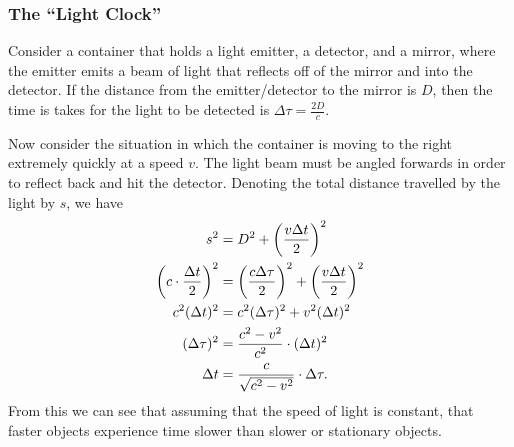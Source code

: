 \documentclass[class=article, crop=false]{standalone}
\begin{document}
  \subsubsection{The ``Light Clock''}
  Consider a container that holds a light emitter, a detector, and a mirror, where the emitter emits a beam of light that reflects off of the mirror and into the detector. If the distance from the emitter/detector to the mirror is $D$, then the time is takes for the light to be detected is $\Delta \tau = \frac{2D}{c}$. \par
  Now consider the situation in which the container is moving to the right extremely quickly at a speed $v$. The light beam must be angled forwards in order to reflect back and hit the detector. Denoting the total distance travelled by the light by $s$, we have
  \begin{align*}
    s^2 &= D^2 + \left( \frac{v\Delta t}{2} \right)^2 \\
    \left( c\cdot \frac{\Delta t}{2} \right)^2 &= \left( \frac{c\Delta\tau}{2} \right)^2 + \left( \frac{v\Delta t}{2} \right)^2 \\
    c^2(\Delta t)^2 &= c^2(\Delta\tau)^2 + v^2(\Delta t)^2 \\
    (\Delta\tau)^2 &= \frac{c^2-v^2}{c^2}\cdot (\Delta t)^2 \\
    \Delta t &= \frac{c}{\sqrt{c^2-v^2}}\cdot \Delta\tau.
  \end{align*}
  From this we can see that assuming that the speed of light is constant, that faster objects experience time slower than slower or stationary objects.
\end{document}
